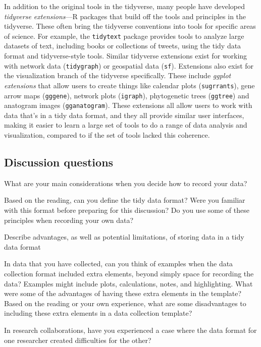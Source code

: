 \documentclass[]{tufte-book}
\begin{document}
In addition to the original tools in the tidyverse, many people have developed
\emph{tidyverse extensions}---R packages that build off the tools and principles in
the tidyverse. These often bring the tidyverse conventions into tools for
specific areas of science. For example, the \texttt{tidytext} package provides tools to
analyze large datasets of text, including books or collections of tweets, using
the tidy data format and tidyverse-style tools. Similar tidyverse extensions
exist for working with network data (\texttt{tidygraph}) or geospatial data (\texttt{sf}).
Extensions also exist for the visualization branch of the tidyverse
specifically. These include \emph{ggplot extensions} that allow users to create
things like calendar plots (\texttt{sugrrants}), gene arrow maps (\texttt{gggene}), network
plots (\texttt{igraph}), phytogenetic trees (\texttt{ggtree}) and anatogram images
(\texttt{gganatogram}). These extensions all allow users to work with data that's in a
tidy data format, and they all provide similar user interfaces, making it
easier to learn a large set of tools to do a range of data analysis and
visualization, compared to if the set of tools lacked this coherence.

\subsection{Discussion questions}\label{discussion-questions}

What are your main considerations when you decide how to record your data?

Based on the reading, can you define the tidy data format? Were you familiar with this format before preparing for this discussion? Do you use some of these principles when recording your own data?

Describe advantages, as well as potential limitations, of storing data in a tidy data format

In data that you have collected, can you think of examples when the data collection format included extra elements, beyond simply space for recording the data? Examples might include plots, calculations, notes, and highlighting. What were some of the advantages of having these extra elements in the template? Based on the reading or your own experience, what are some disadvantages to including these extra elements in a data collection template?

In research collaborations, have you experienced a case where the data format for one researcher created difficulties for the other?
\end{document}
